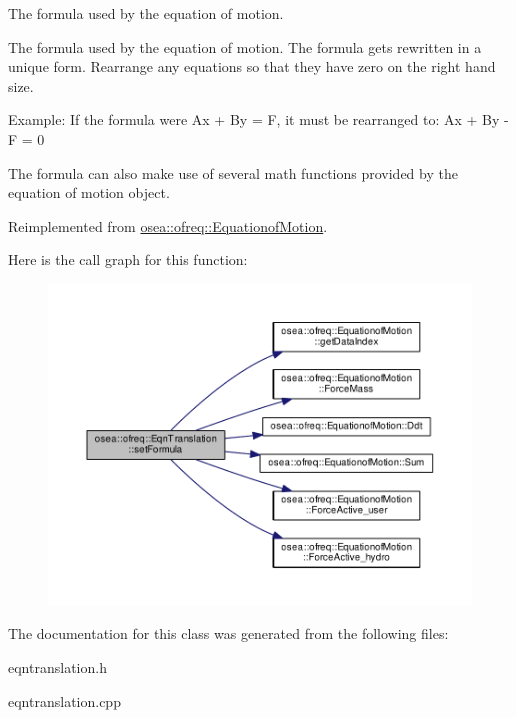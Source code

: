 The formula used by the equation of motion. 

The formula used by the equation of motion. The formula gets rewritten in a unique form. Rearrange any equations so that they have zero on the right hand size.

Example\-: If the formula were Ax + By = F, it must be rearranged to\-: Ax + By -\/ F = 0

The formula can also make use of several math functions provided by the equation of motion object. 

Reimplemented from \hyperlink{classosea_1_1ofreq_1_1_equationof_motion_a1d8614b11de9396f3795e4b560e6c368}{osea\-::ofreq\-::\-Equationof\-Motion}.



Here is the call graph for this function\-:
\nopagebreak
\begin{figure}[H]
\begin{center}
\leavevmode
\includegraphics[width=350pt]{classosea_1_1ofreq_1_1_eqn_translation_af2681a6f73df8e8518d81eba5ac9152e_cgraph}
\end{center}
\end{figure}




The documentation for this class was generated from the following files\-:\begin{DoxyCompactItemize}
\item 
eqntranslation.\-h\item 
eqntranslation.\-cpp\end{DoxyCompactItemize}
